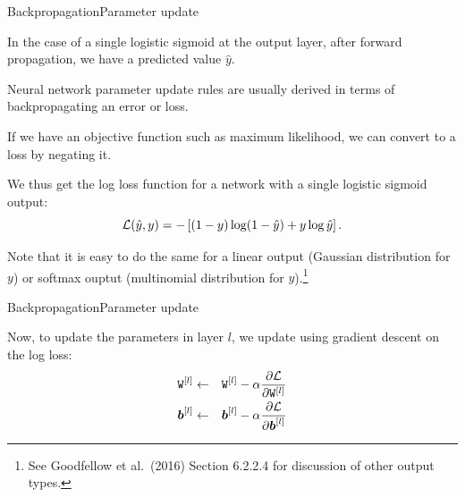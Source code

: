 \documentclass{beamer}
\renewcommand{\vec}[1]{\boldsymbol{#1}}
\newcommand{\mat}[1]{\mathtt{#1}}
\begin{document}
\begin{frame}{Backpropagation}{Parameter update}

  In the case of a single logistic sigmoid at the output layer, after
  forward propagation, we have a predicted value $\hat{y}$.

  \medskip

  Neural network parameter update rules are usually derived in terms of
  backpropagating an \alert{error} or \alert{loss}.

  \medskip

  If we have an objective function such as
  maximum likelihood, we can convert to a loss by \alert{negating} it.

  \medskip

  We thus get the \alert{log loss} function for a network with a single
  logistic sigmoid output:
  \[ {\cal L}(\hat{y},y) = - \left[(1-y)\log(1-\hat{y})+y\log\hat{y}\right]. \]

  Note that it is easy to do the same for a linear output (Gaussian
  distribution for $y$) or softmax ouptut (multinomial distribution
  for $y$).\footnote{See Goodfellow et al.\ (2016) Section 6.2.2.4 for
    discussion of other output types.}

\end{frame}


\begin{frame}{Backpropagation}{Parameter update}

  Now, to update the parameters in layer $l$, we update using
  \alert{gradient descent} on the log loss:
  \begin{eqnarray*}
    \mat{W}^{[l]} & \leftarrow & \mat{W}^{[l]} - \alpha \frac{\partial {\cal L}}{\partial \mat{W}^{[l]}} \\
    \vec{b}^{[l]} & \leftarrow & \vec{b}^{[l]} - \alpha \frac{\partial {\cal L}}{\partial \vec{b}^{[l]}}
  \end{eqnarray*}
  
\end{frame}
\end{document}
